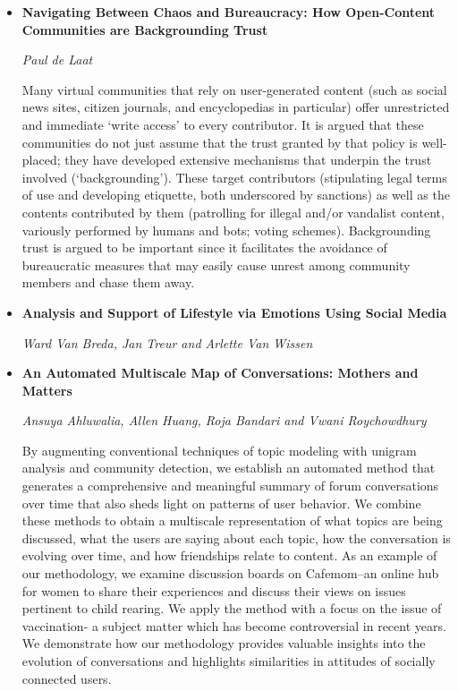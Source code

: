 \begin{itemize}
\item \textbf{Navigating Between Chaos and Bureaucracy: How Open-Content
Communities are Backgrounding Trust}

\textit{Paul de Laat}

Many virtual communities that rely on user-generated content (such as social
news sites, citizen journals, and encyclopedias in particular) offer
unrestricted and immediate ‘write access’ to every contributor. It is argued
that these communities do not just assume that the trust granted by that policy
is well-placed; they have developed extensive mechanisms that underpin the trust
involved (‘backgrounding’). These target contributors (stipulating legal terms
of use and developing etiquette, both underscored by sanctions) as well as the
contents contributed by them (patrolling for illegal and/or vandalist content,
variously performed by humans and bots; voting schemes). Backgrounding trust is
argued to be important since it facilitates the avoidance of bureaucratic
measures that may easily cause unrest among community members and chase them
away.


\item \textbf{Analysis and Support of Lifestyle via Emotions Using Social Media}

\textit{Ward Van Breda, Jan Treur and Arlette Van Wissen}

\item \textbf{An Automated Multiscale Map of Conversations: Mothers and Matters}

\textit{Ansuya Ahluwalia, Allen Huang, Roja Bandari and Vwani Roychowdhury}

By augmenting conventional techniques of topic modeling with unigram analysis
and community detection, we establish an automated method that generates a
comprehensive and meaningful summary of forum conversations over time that also
sheds light on patterns of user behavior. We combine these methods to obtain a
multiscale representation of what topics are being discussed, what the users are
saying about each topic, how the conversation is evolving over time, and how
friendships relate to content. As an example of our methodology, we examine
discussion boards on Cafemom–an online hub for women to share their experiences
and discuss their views on issues pertinent to child rearing. We apply the
method with a focus on the issue of vaccination- a subject matter which has
become controversial in recent years. We demonstrate how our methodology
provides valuable insights into the evolution of conversations and highlights
similarities in attitudes of socially connected users.



\end{itemize}
